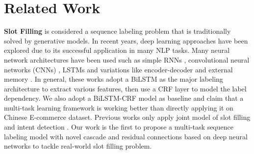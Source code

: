 \section{Related Work}
\label{sec:related}
\textbf{Slot Filling} is considered a sequence labeling problem
that is traditionally solved by generative models.
In recent years,
deep learning approaches have been explored
due to its successful application in many NLP tasks.
Many neural network architectures have been used such as
simple RNNs \cite{yao2013recurrent,mesnil2015using}, 
convolutional neural networks (CNNs) \cite{xu2013convolutional},
LSTMs \cite{yao2014spoken} 
and variations like encoder-decoder \cite{zhu2017encoder,zhai2017neural} 
and external memory \cite{peng2015recurrent}.
In general, these works adopt a BiLSTM as the major labeling architecture
to extract various features, 
then use a CRF layer \cite{huang2015bidirectional} to model 
the label dependency.
We also adopt a BiLSTM-CRF model as baseline and claim that
a multi-task learning framework is working better than directly 
applying it on Chinese E-commerce dataset.
Previous works
only apply joint model of slot filling and intent detection \cite{zhang2016joint,liu2016joint}.
Our work is the first to propose a multi-task sequence labeling model with novel cascade and residual connections based on 
deep neural networks to tackle real-world slot filling problem.

